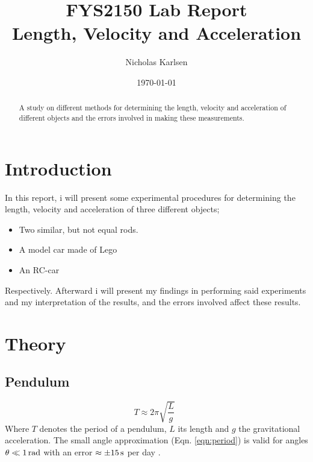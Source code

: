 \documentclass[11pt,a4paper]{article}
\begin{document}

\title{FYS2150 Lab Report\\Length, Velocity and Acceleration}%

\author{Nicholas Karlsen}

\date{\today}%

\maketitle

\begin{abstract}
  A study on different methods for determining the length, velocity and acceleration of different objects and the errors involved in making these measurements.
\end{abstract}
\section{\label{sec:intro}Introduction}
  In this report, i will present some experimental procedures for determining the length, velocity and acceleration of three different objects; 
  \begin{itemize}
    \item Two similar, but not equal rods.
    \item A model car made of Lego
    \item An RC-car
  \end{itemize}
  Respectively. Afterward i will present my findings in performing said experiments and my interpretation of the results, and the errors involved affect these results.

\section{\label{sec:theory}Theory}
  \subsection{Pendulum}
    \begin{equation}
      \label{eqn:period}
        T \approx 2\pi \sqrt{\frac{L}{g}}\enspace
    \end{equation}
    Where $T$ denotes the period of a pendulum, $L$ its length and $g$ the gravitational acceleration. The small angle approximation (Eqn. \ref{eqn:period})  is valid for angles $\theta \ll 1\, \textup{rad}$ with an error $\approx \pm 15 \, \textup{s}$ per day \cite{pend_wik}.
\end{document}
